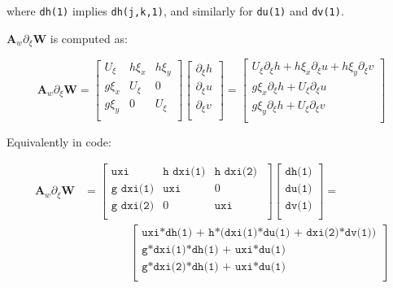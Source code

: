 \documentclass{article}
\newcommand{\code}[1]{\texttt{#1}}
\begin{document}
where  \code{dh(1)} implies \code{dh(j,k,1)}, and similarly for  \code{du(1)} and  \code{dv(1)}. 

$ \mathbf{A}_w \partial_\xi \mathbf{W} $ is computed as:

\[ \mathbf{A}_w \partial_\xi \mathbf{W} = 
\begin{bmatrix}
    U_{\xi} & h \xi_x & h \xi_{y}  \\
    g \xi_x &    U_{\xi}  & 0   \\
    g \xi_y &   0   & U_{\xi}    \\           
\end{bmatrix} 
\begin{bmatrix}
    \partial_\xi h \\
	\partial_\xi u \\
    \partial_\xi v \\
\end{bmatrix}
 =  
	 \begin{bmatrix}
	  U_{\xi}  \partial_\xi h +  h \xi_x  \partial_\xi u + h \xi_{y} \partial_\xi v \\[.1cm]
	  g \xi_x \partial_\xi h  +  U_{\xi} \partial_\xi u    \\[.1cm]
	  g \xi_y  \partial_\xi h  +  U_{\xi}  \partial_\xi v  \\	 	 
\end{bmatrix} 
 \]

Equivalently in code:

\begin{equation*}\label{theta-alt}
\begin{aligned}
\mathbf{A}_w \partial_\xi \mathbf{W}  &=
 \begin{bmatrix}
     \code{uxi} & \code{h dxi(1)} & \code{h  dxi(2) } \\
     \code{g dxi(1)} & \code{uxi} &  0  \\     
     \code{g dxi(2)} & 0 &  \code{uxi}  \\     
\end{bmatrix}
	 \begin{bmatrix}
	 \code{dh(1)} \\
	 \code{du(1)} \\	 
	 \code{dv(1)} \\	 	  	 	 
\end{bmatrix}  = \\
&\qquad\qquad
	 \begin{bmatrix}
	  \code{uxi*dh(1) + h*(dxi(1)*du(1) + dxi(2)*dv(1))} \\
	   \code{g*dxi(1)*dh(1)  + uxi*du(1) } \\ 	 	 	 	 
	   \code{g*dxi(2)*dh(1)  + uxi*du(1) } \\ 	 	 	 	 	   
\end{bmatrix} 
\end{aligned}
\end{equation*}
\end{document}
